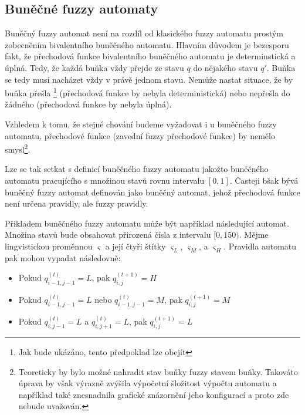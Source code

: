 \documentclass[a4paper,10pt]{article}
\begin{document}
\subsection{Buněčné fuzzy automaty}
Buněčný fuzzy automat není na rozdíl od klasického fuzzy automatu prostým zobecněním bivalentního buněčného automatu. Hlavním důvodem je bezesporu fakt, že přechodová funkce bivalentního buněčného automatu je determinstická a úplná. Tedy, že každá buňka vždy přejde ze stavu $q$ do nějakého stavu $q'$. Buňka se tedy musí nacházet vždy v právě jednom stavu. Nemůže nastat situace, že by buňka přešla \footnote{Jak bude ukázáno, tento předpoklad lze obejít} (přechodová funkce by nebyla deterministická) nebo nepřešla do žádného (přechodová funkce by nebyla úplná).

Vzhledem k tomu, že stejné chování budeme vyžadovat i u buněčného fuzzy automatu,  přechodové funkce (zavední fuzzy přechodové funkce) by nemělo smysl\footnote{Teoreticky by bylo možné nahradit stav buňky fuzzy stavem buňky. Takováto úprava by však výrazně zvýšila výpočetní šložitost výpočtu automatu a například také znesnadnila grafické znázornění jeho konfigurací a proto zde nebude uvažován.}.

Lze se tak setkat s definicí buněčného fuzzy automatu jakožto buněčného automatu pracujícího s množinou stavů rovnu intervalu $[0,1]$. Časteji bšak bývá buněčný fuzzy automat definován jako buněčný automat, jehož přechodová funkce není určena  \ifthen pravidly, ale fuzzy \ifthen pravidly.

\begin{example}
 Příkladem buněčného fuzzy automatu může být například následující automat. Množina stavů bude obsahovat přirozená čísla z intervalu $[0, 150)$. Mějme lingvistickou proměnnou $\varsigma$ a její čtyři štítky $\varsigma_L$, $\varsigma_M$, a $\varsigma_H$.
 Pravidla automatu pak mohou vypadat následovně:
 \begin{itemize}
  \item Pokud $q^{(t)}_{i-1,j-1} = L$, pak $q^{(t+1)}_{i,j} = H$
  \item Pokud $q^{(t)}_{i-1,j-1} = L$ nebo $q^{(t)}_{i-1,j-1} = M$, pak $q^{(t+1)}_{i,j} = M$
  \item Pokud $q^{(t)}_{i,j-1} = L$ a $q^{(t)}_{i,j+1} = L$, pak $q^{(t+1)}_{i,j} = L$
 \end{itemize}
\end{example}
\end{document}
